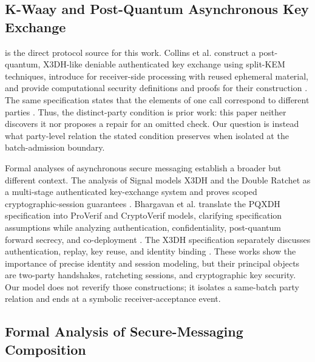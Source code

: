 
\subsection{K-Waay and Post-Quantum Asynchronous Key Exchange}

\kwaay is the direct protocol source for this work. Collins et al. construct a
post-quantum, X3DH-like deniable authenticated key exchange using split-KEM
techniques, introduce \batchreceive for receiver-side processing with reused
ephemeral material, and provide computational security definitions and proofs
for their construction \cite{collins2024kwaay}. The same specification states
that the elements of one \batchreceive call correspond to different parties
\cite[Sec.~5.1, p.~21]{collins2024kwaayfull}. Thus, the distinct-party condition is prior
work: this paper neither discovers it nor proposes a repair for an omitted
check. Our question is instead what party-level relation the stated condition
preserves when isolated at the batch-admission boundary.

Formal analyses of asynchronous secure messaging establish a broader but
different context. The analysis of Signal models X3DH and the Double Ratchet
as a multi-stage authenticated key-exchange system and proves scoped
cryptographic-session guarantees \cite{cohngordon2020signal}. Bhargavan et al.
translate the PQXDH specification into ProVerif and CryptoVerif models,
clarifying specification assumptions while analyzing authentication,
confidentiality, post-quantum forward secrecy, and co-deployment
\cite{bhargavan2024pqxdh}. The X3DH specification separately discusses
authentication, replay, key reuse, and identity binding
\cite{marlinspike2016x3dh}. These works show the importance of precise
identity and session modeling, but their principal objects are two-party
handshakes, ratcheting sessions, and cryptographic key security. Our model does
not reverify those constructions; it isolates a same-batch party relation and
ends at a symbolic receiver-acceptance event.

\subsection{Formal Analysis of Secure-Messaging Composition}

